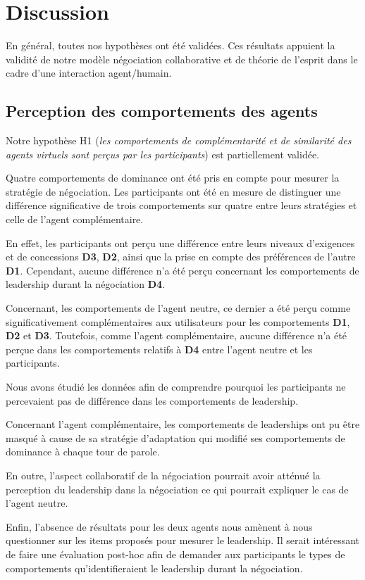 	\section{Discussion}
	\label{sec:discussion}
	En général, toutes nos hypothèses ont été validées. Ces résultats appuient la validité de notre modèle négociation collaborative et de théorie de l'esprit dans le cadre d'une interaction agent/humain.   
	
	\subsection{Perception des comportements des agents}
	Notre hypothèse H1 (\textit{les comportements de complémentarité et de similarité des agents virtuels sont perçus par les participants}) est partiellement validée. 
	
	Quatre comportements de dominance ont été pris en compte pour mesurer la stratégie de négociation. 
	Les participants ont été en mesure de distinguer une différence significative de trois comportements sur quatre entre leurs stratégies et celle de l'agent complémentaire.
	
	En effet, les participants ont perçu une différence entre leurs niveaux d'exigences et de concessions \textbf{D3}, \textbf{D2}, ainsi que la prise en compte des préférences de l'autre \textbf{D1}. Cependant, aucune différence n'a été perçu concernant les comportements de leadership durant la négociation \textbf{D4}. 
	
	Concernant, les comportements de l'agent neutre, ce dernier a été perçu comme significativement complémentaires aux utilisateurs pour les comportements \textbf{D1}, \textbf{D2} et \textbf{D3}. 
	Toutefois, comme l'agent complémentaire, aucune différence n'a été perçue dans les comportements relatifs à \textbf{D4} entre l'agent neutre et les participants. 
	
	Nous avons étudié les données afin de comprendre pourquoi les participants ne percevaient pas de différence dans les comportements de leadership. 
	
	Concernant l'agent complémentaire, les comportements de leaderships ont pu être masqué à cause de  sa stratégie d'adaptation qui modifié ses comportements de dominance à chaque tour de parole.
	
	En outre, l'aspect collaboratif de la négociation pourrait avoir atténué la perception du leadership dans la négociation ce qui pourrait expliquer le cas de l'agent neutre. 
	
	Enfin, l'absence de résultats pour les deux agents nous amènent à nous questionner sur les items proposés pour mesurer le leadership. 
	Il serait intéressant de faire une évaluation post-hoc afin de demander aux participants le types de comportements qu'identifieraient le leadership durant la négociation.
	
